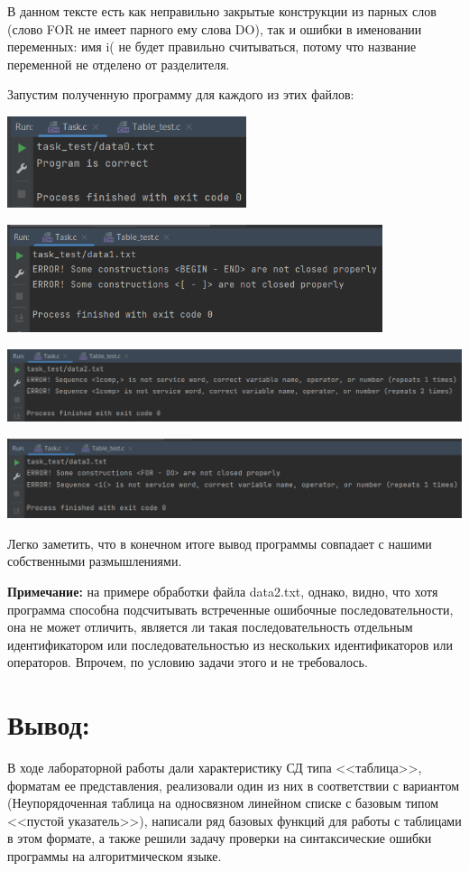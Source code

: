 \documentclass[12pt]{article}
\begin{document}
{	В данном тексте есть как неправильно закрытые конструкции из парных слов (слово FOR не имеет парного ему слова DO), так и ошибки в именовании переменных: имя i( не будет правильно считываться, потому что название переменной не отделено от разделителя. 
	
	Запустим полученную программу для каждого из этих файлов:
	
	\includegraphics[width=70mm]{images/output0.png} 
	
	\includegraphics[width=110mm]{images/output1.png} 
	
	\includegraphics[width=180mm]{images/output2.png} 
	
	\includegraphics[width=180mm]{images/output3.png} 
	
	Легко заметить, что в конечном итоге вывод программы совпадает с нашими собственными размышлениями. 
	
	{\bf Примечание:} на примере обработки файла data2.txt, однако, видно, что хотя программа способна подсчитывать встреченные ошибочные последовательности, она не может отличить, является ли такая последовательность отдельным идентификатором или последовательностью из нескольких идентификаторов или операторов. Впрочем, по условию задачи этого и не требовалось.
	
	\section{Вывод:}
	
	В ходе лабораторной работы дали характеристику СД типа <<таблица>>, форматам ее представления, реализовали один из них в соответствии с вариантом (Неупорядоченная таблица на односвязном линейном списке с базовым типом <<пустой указатель>>), написали ряд базовых функций для работы с таблицами в этом формате, а также решили задачу проверки на синтаксические ошибки программы на алгоритмическом языке.
}
\end{document}
